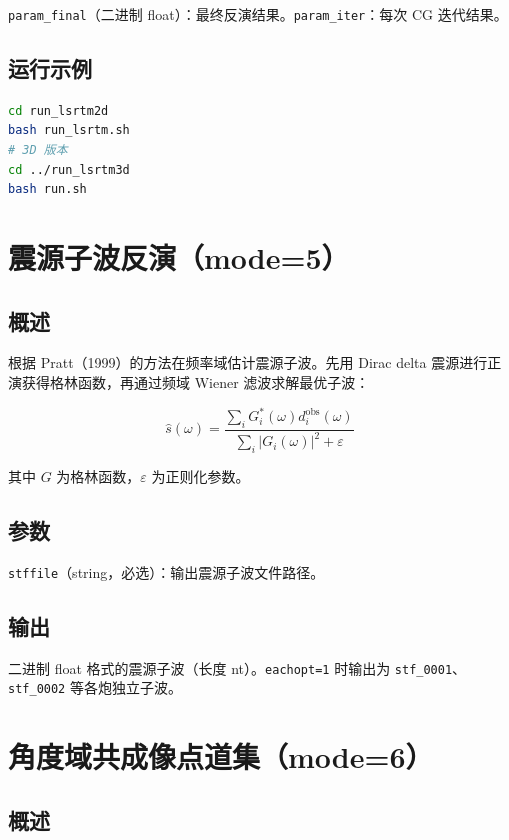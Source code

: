 \documentclass[11pt,a4paper]{ctexart}
\begin{document}
\texttt{param\_final}（二进制 float）：最终反演结果。\texttt{param\_iter}：每次 CG 迭代结果。

\subsection{运行示例}

\begin{lstlisting}[language=bash]
cd run_lsrtm2d
bash run_lsrtm.sh
# 3D 版本
cd ../run_lsrtm3d
bash run.sh
\end{lstlisting}


\section{震源子波反演（mode=5）}

\subsection{概述}

根据 Pratt（1999）的方法在频率域估计震源子波。先用 Dirac delta 震源进行正演获得格林函数，再通过频域 Wiener 滤波求解最优子波：

\[
\hat{s}(\omega) = \frac{\sum_i G_i^*(\omega) d_i^{\text{obs}}(\omega)}
                         {\sum_i |G_i(\omega)|^2 + \varepsilon}
\]

其中 $G$ 为格林函数，$\varepsilon$ 为正则化参数。

\subsection{参数}

\texttt{stffile}（string，必选）：输出震源子波文件路径。

\subsection{输出}

二进制 float 格式的震源子波（长度 nt）。\texttt{eachopt=1} 时输出为 \texttt{stf\_0001}、\texttt{stf\_0002} 等各炮独立子波。


\section{角度域共成像点道集（mode=6）}

\subsection{概述}
\end{document}
